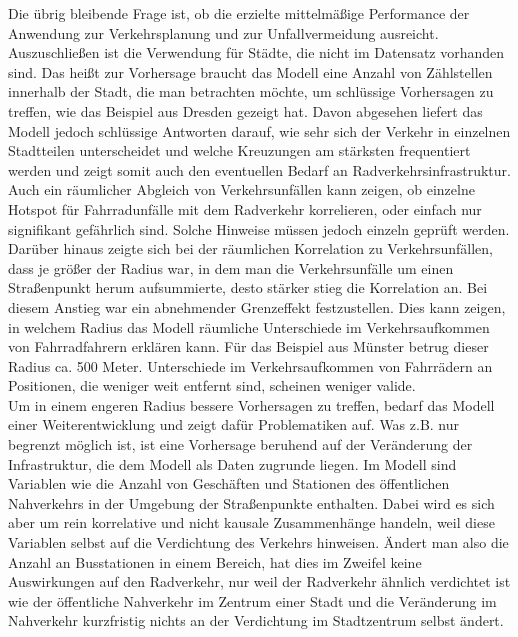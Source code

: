 \documentclass[a4paper,12pt]{thesis}
\begin{document}
Die übrig bleibende Frage ist, ob die erzielte mittelmäßige Performance der Anwendung zur Verkehrsplanung und zur Unfallvermeidung ausreicht. Auszuschließen ist die Verwendung für Städte, die nicht im Datensatz vorhanden sind. Das heißt zur Vorhersage braucht das Modell eine Anzahl von Zählstellen innerhalb der Stadt, die man betrachten möchte, um schlüssige Vorhersagen zu treffen, wie das Beispiel aus Dresden gezeigt hat. Davon abgesehen liefert das Modell jedoch schlüssige Antworten darauf, wie sehr sich der Verkehr in einzelnen Stadtteilen unterscheidet und welche Kreuzungen am stärksten frequentiert werden und zeigt somit auch den eventuellen Bedarf an Radverkehrsinfrastruktur. Auch ein räumlicher Abgleich von Verkehrsunfällen kann zeigen, ob einzelne Hotspot für Fahrradunfälle mit dem Radverkehr korrelieren, oder einfach nur signifikant gefährlich sind. Solche Hinweise müssen jedoch einzeln geprüft werden. Darüber hinaus zeigte sich bei der räumlichen Korrelation zu Verkehrsunfällen, dass je größer der Radius war, in dem man die Verkehrsunfälle um einen Straßenpunkt herum aufsummierte, desto stärker stieg die Korrelation an. Bei diesem Anstieg war ein abnehmender Grenzeffekt festzustellen. Dies kann zeigen, in welchem Radius das Modell räumliche Unterschiede im Verkehrsaufkommen von Fahrradfahrern erklären kann.  Für das Beispiel aus Münster betrug dieser Radius ca. 500 Meter. Unterschiede im Verkehrsaufkommen von Fahrrädern an Positionen, die weniger weit entfernt sind, scheinen weniger valide.\\
Um in einem engeren Radius bessere Vorhersagen zu treffen, bedarf das Modell einer Weiterentwicklung und zeigt dafür Problematiken auf. Was z.B. nur begrenzt möglich ist, ist eine Vorhersage beruhend auf der Veränderung der Infrastruktur, die dem Modell als Daten zugrunde liegen. Im Modell sind Variablen wie die Anzahl von Geschäften und Stationen des öffentlichen Nahverkehrs in der Umgebung der Straßenpunkte enthalten. Dabei wird es sich aber um rein korrelative und nicht kausale Zusammenhänge handeln, weil diese Variablen selbst auf die Verdichtung des Verkehrs hinweisen. Ändert man also die Anzahl an Busstationen in einem Bereich, hat dies im Zweifel keine Auswirkungen auf den Radverkehr, nur  weil der Radverkehr ähnlich verdichtet ist wie der öffentliche Nahverkehr im Zentrum einer Stadt und die Veränderung im Nahverkehr kurzfristig nichts an der Verdichtung im Stadtzentrum selbst ändert.\\
\end{document}
